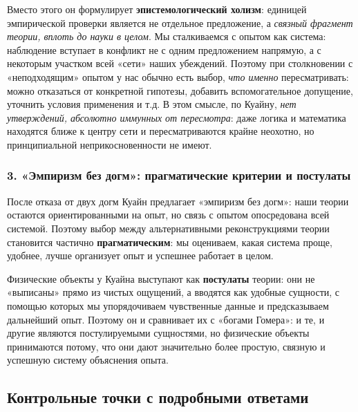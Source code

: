 \documentclass[a4paper,12pt]{article}
\begin{document}
Вместо этого он формулирует \textbf{эпистемологический холизм}: единицей эмпирической проверки является не отдельное предложение, а \emph{связный фрагмент теории, вплоть до науки в целом}. Мы сталкиваемся с опытом как система: наблюдение вступает в конфликт не с одним предложением напрямую, а с некоторым участком всей «сети» наших убеждений. Поэтому при столкновении с «неподходящим» опытом у нас обычно есть выбор, \emph{что именно} пересматривать: можно отказаться от конкретной гипотезы, добавить вспомогательное допущение, уточнить условия применения и т.д. В этом смысле, по Куайну, \emph{нет утверждений, абсолютно иммунных от пересмотра}: даже логика и математика находятся ближе к центру сети и пересматриваются крайне неохотно, но принципиальной неприкосновенности не имеют.

\subsubsection*{3. «Эмпиризм без догм»: прагматические критерии и постулаты}

После отказа от двух догм Куайн предлагает «эмпиризм без догм»: наши теории остаются ориентированными на опыт, но связь с опытом опосредована всей системой. Поэтому выбор между альтернативными реконструкциями теории становится частично \textbf{прагматическим}: мы оцениваем, какая система проще, удобнее, лучше организует опыт и успешнее работает в целом.

Физические объекты у Куайна выступают как \textbf{постулаты} теории: они не «выписаны» прямо из чистых ощущений, а вводятся как удобные сущности, с помощью которых мы упорядочиваем чувственные данные и предсказываем дальнейший опыт. Поэтому он и сравнивает их с «богами Гомера»: и те, и другие являются постулируемыми сущностями, но физические объекты принимаются потому, что они дают значительно более простую, связную и успешную систему объяснения опыта.

\subsection{Контрольные точки с подробными ответами}
\end{document}
